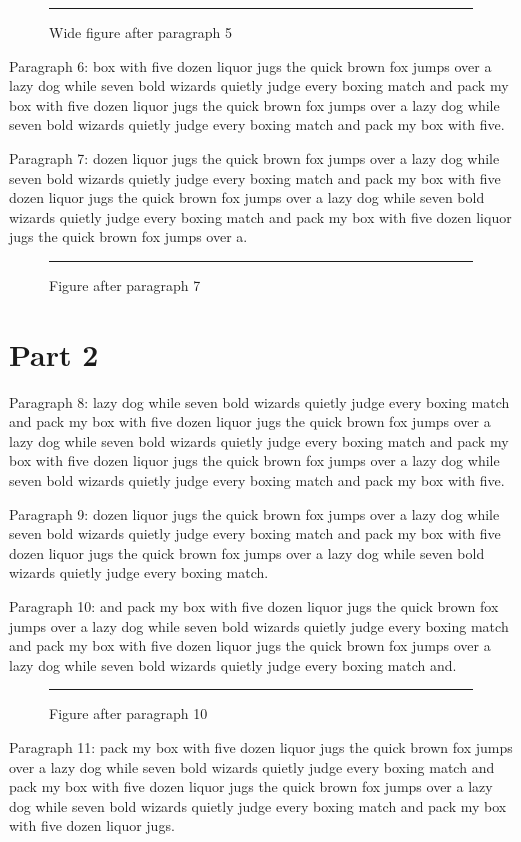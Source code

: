 \documentclass[twocolumn]{article}
\begin{document}
\begin{figure}[t]\centering\rule{0.7\textwidth}{7em}\caption{Wide figure after paragraph 5}\end{figure}
Paragraph 6: box with five dozen liquor jugs the quick brown fox jumps over a lazy dog while seven bold wizards quietly judge every boxing match and pack my box with five dozen liquor jugs the quick brown fox jumps over a lazy dog while seven bold wizards quietly judge every boxing match and pack my box with five.

Paragraph 7: dozen liquor jugs the quick brown fox jumps over a lazy dog while seven bold wizards quietly judge every boxing match and pack my box with five dozen liquor jugs the quick brown fox jumps over a lazy dog while seven bold wizards quietly judge every boxing match and pack my box with five dozen liquor jugs the quick brown fox jumps over a.

\begin{figure}[tbp]\centering\rule{0.8\columnwidth}{8em}\caption{Figure after paragraph 7}\end{figure}
\section{Part 2}
Paragraph 8: lazy dog while seven bold wizards quietly judge every boxing match and pack my box with five dozen liquor jugs the quick brown fox jumps over a lazy dog while seven bold wizards quietly judge every boxing match and pack my box with five dozen liquor jugs the quick brown fox jumps over a lazy dog while seven bold wizards quietly judge every boxing match and pack my box with five.

Paragraph 9: dozen liquor jugs the quick brown fox jumps over a lazy dog while seven bold wizards quietly judge every boxing match and pack my box with five dozen liquor jugs the quick brown fox jumps over a lazy dog while seven bold wizards quietly judge every boxing match.

Paragraph 10: and pack my box with five dozen liquor jugs the quick brown fox jumps over a lazy dog while seven bold wizards quietly judge every boxing match and pack my box with five dozen liquor jugs the quick brown fox jumps over a lazy dog while seven bold wizards quietly judge every boxing match and.

\begin{figure}[htbp]\centering\rule{0.8\columnwidth}{5em}\caption{Figure after paragraph 10}\end{figure}
Paragraph 11: pack my box with five dozen liquor jugs the quick brown fox jumps over a lazy dog while seven bold wizards quietly judge every boxing match and pack my box with five dozen liquor jugs the quick brown fox jumps over a lazy dog while seven bold wizards quietly judge every boxing match and pack my box with five dozen liquor jugs.
\end{document}
